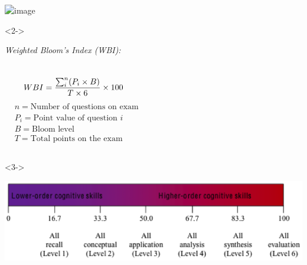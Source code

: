 \begin{noheadline}
\begin{frame}[t]
    \begin{adjustwidth}{-1.5em}{-1.5em}
    \vspace{-2mm}
    \centerline{
    \includegraphics<1->[page=1,width=0.85\linewidth]{./bloom.png}
    }

    \vspace{-1mm}
    \begin{uncoverenv}<2->
    \begin{block}{\small\it Weighted Bloom's Index (WBI):}
    \begin{columns}
            \small
            \begin{align*}
                \small
                &WBI = \frac{\sum_{i}^{n} (P_i \times B)}{
                    T \times 6} \times 100 \\
            \end{align*}
            \vspace{-4.5mm}
            {\footnotesize
            \begin{align*}
                &n = \textrm{Number of questions on exam} \\
                &P_i = \textrm{Point value of question $i$}\\
                &B = \textrm{Bloom level}\\
                &T = \textrm{Total points on the exam}
            \end{align*}
            }
            \vspace{-6.5mm}
    \end{columns}
    \end{block}
    \end{uncoverenv}

    \begin{uncoverenv}<3->
    \centerline{
    \includegraphics[page=1,width=0.75\linewidth]{./bloom-scale.png}
    }
    \end{uncoverenv}
    \end{adjustwidth}
\end{frame}
\end{noheadline}

